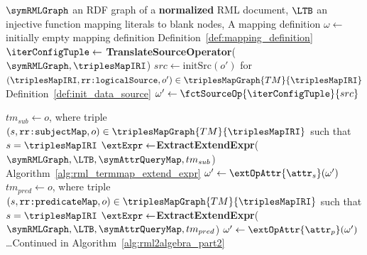 \begin{algorithm}[htbp]
	\caption{RML translation to algebraic mapping expressions}
	\label{alg:rml2algebra}
	\begin{algorithmic}[1]
		\Require $\symRMLGraph$ an RDF graph of a \textbf{normalized} RML document, 
        \Statex \qquad $\LTB$ an injective function mapping literals to blank nodes, 
        \Ensure A mapping definition
        \State $\omega \gets$ initially empty mapping definition \Comment Definition~\ref{def:mapping_definition}
	    	\State  $\iterConfigTuple \gets$ \textbf{TranslateSourceOperator}($\symRMLGraph, \triplesMapIRI$) 
            \State   $src \gets \textrm{initSrc}(o')$ for $(\triplesMapIRI,\texttt{rr:logicalSource},o') \in \triplesMapGraph{TM}{\triplesMapIRI}$ \Comment Definition~\ref{def:init_data_source}
	    	\State   $\omega' \gets \fctSourceOp{\iterConfigTuple}{src}$

            \Statex
            \State $tm_{sub} \gets o$, where triple $(s,\texttt{rr:subjectMap},o) \in \triplesMapGraph{TM}{\triplesMapIRI}$ such that $s = \triplesMapIRI$
            \State $\extExpr \gets $\textbf{ExtractExtendExpr}($\symRMLGraph, \LTB, \symAttrQueryMap, tm_{sub}$) \Comment Algorithm~\ref{alg:rml_termmap_extend_expr}
            \State $\omega' \gets \extOpAttr{\attr_{s}}(\omega')$
            \Statex
            \State $tm_{pred} \gets o$, where triple $(s,\texttt{rr:predicateMap},o) \in \triplesMapGraph{TM}{\triplesMapIRI}$ such that $s = \triplesMapIRI$
            \State $\extExpr \gets $\textbf{ExtractExtendExpr}($\symRMLGraph, \LTB, \symAttrQueryMap, tm_{pred}$)
            \State $\omega' \gets \extOpAttr{\attr_{p}}(\omega')$
		    \State\dots  \Comment Continued in Algorithm~\ref{alg:rml2algebra_part2}
	\end{algorithmic}
\end{algorithm}

